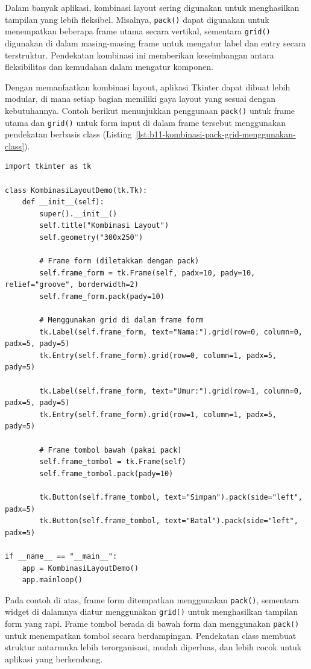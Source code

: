 Dalam banyak aplikasi, kombinasi layout sering digunakan untuk menghasilkan tampilan yang lebih fleksibel. Misalnya, \texttt{pack()} dapat digunakan untuk menempatkan beberapa frame utama secara vertikal, sementara \texttt{grid()} digunakan di dalam masing-masing frame untuk mengatur label dan entry secara terstruktur. Pendekatan kombinasi ini memberikan keseimbangan antara fleksibilitas dan kemudahan dalam mengatur komponen.

Dengan memanfaatkan kombinasi layout, aplikasi Tkinter dapat dibuat lebih modular, di mana setiap bagian memiliki gaya layout yang sesuai dengan kebutuhannya. Contoh berikut menunjukkan penggunaan \texttt{pack()} untuk frame utama dan \texttt{grid()} untuk form input di dalam frame tersebut menggunakan pendekatan berbasis class (Listing~\ref{lst:b11-kombinasi-pack-grid-menggunakan-class}).

\begin{lstlisting}[style=PythonStyle, caption={Kombinasi pack() dan grid() Menggunakan Class}, label={lst:b11-kombinasi-pack-grid-menggunakan-class}]
import tkinter as tk

class KombinasiLayoutDemo(tk.Tk):
    def __init__(self):
        super().__init__()
        self.title("Kombinasi Layout")
        self.geometry("300x250")

        # Frame form (diletakkan dengan pack)
        self.frame_form = tk.Frame(self, padx=10, pady=10, relief="groove", borderwidth=2)
        self.frame_form.pack(pady=10)

        # Menggunakan grid di dalam frame form
        tk.Label(self.frame_form, text="Nama:").grid(row=0, column=0, padx=5, pady=5)
        tk.Entry(self.frame_form).grid(row=0, column=1, padx=5, pady=5)

        tk.Label(self.frame_form, text="Umur:").grid(row=1, column=0, padx=5, pady=5)
        tk.Entry(self.frame_form).grid(row=1, column=1, padx=5, pady=5)

        # Frame tombol bawah (pakai pack)
        self.frame_tombol = tk.Frame(self)
        self.frame_tombol.pack(pady=10)

        tk.Button(self.frame_tombol, text="Simpan").pack(side="left", padx=5)
        tk.Button(self.frame_tombol, text="Batal").pack(side="left", padx=5)

if __name__ == "__main__":
    app = KombinasiLayoutDemo()
    app.mainloop()
\end{lstlisting}

Pada contoh di atas, frame form ditempatkan menggunakan \texttt{pack()}, sementara widget di dalamnya diatur menggunakan \texttt{grid()} untuk menghasilkan tampilan form yang rapi. Frame tombol berada di bawah form dan menggunakan \texttt{pack()} untuk menempatkan tombol secara berdampingan. Pendekatan class membuat struktur antarmuka lebih terorganisasi, mudah diperluas, dan lebih cocok untuk aplikasi yang berkembang.


